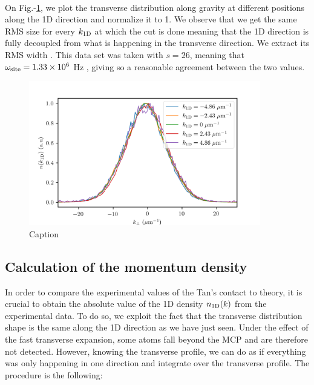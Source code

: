 \paragraph{} On Fig.-\ref{fig:1D_transverse}, we plot the transverse distribution along gravity at different positions along the 1D direction and normalize it to 1. We observe that we get the same RMS size for every $k_{\rm{1D}}$ at which the cut is done meaning that the 1D direction is fully decoupled from what is happening in the transverse direction. We extract its RMS width . This data set was taken with $s=26$, meaning that $\omega_{\rm{site}}=1.33 \times 10^6$ Hz , giving  so a reasonable agreement between the two values. 

\begin{figure}
    \centering
    \includegraphics[width=0.9\textwidth]{Fig/Chapter5/1D_transverse_effect.png}
    \caption{Caption}
    \label{fig:1D_transverse}
\end{figure}

\subsection{Calculation of the momentum density}

In order to compare the experimental values of the Tan's contact to theory, it is crucial to obtain the absolute value of the 1D density $n_{\rm{1D}}(k)$ from the experimental data. To do so, we exploit the fact that the transverse distribution shape is the same along the 1D direction as we have just seen. Under the effect of the fast transverse expansion, some atoms fall beyond the MCP and are therefore not detected. However, knowing the transverse profile, we can do as if everything was only happening in one direction and integrate over the transverse profile. The procedure is the following:

